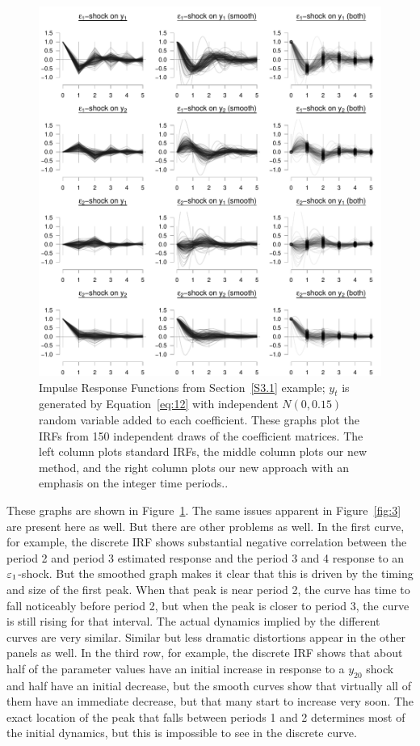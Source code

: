 \documentclass[12pt,fleqn]{article}
\begin{document}
\begin{figure}[t]
  \centering
  \includegraphics{graphs/numeric2.pdf}
  \caption{Impulse Response Functions from Section~\ref{S3.1} example;
    $y_t$ is generated by Equation~\eqref{eq:12} with independent
    $N(0,0.15)$ random variable added to each coefficient. These
    graphs plot the IRFs from 150 independent draws of the
    coefficient matrices. The left column plots standard IRFs, the
    middle column plots our new method, and the right column plots our
    new approach with an emphasis on the integer time periods..}
  \label{fig:4}
\end{figure}

These graphs are shown in Figure~\ref{fig:4}. The same issues apparent
in Figure~\ref{fig:3} are present here as well. But there are other
problems as well. In the first curve, for example, the discrete IRF
shows substantial negative correlation between the period 2 and period
3 estimated response and the period 3 and 4 response to an
$\varepsilon_1$-shock. But the smoothed graph makes it clear that this is
driven by the timing and size of the first peak. When that peak is
near period 2, the curve has time to fall noticeably before period 2,
but when the peak is closer to period 3, the curve is still rising for
that interval. The actual dynamics implied by the different curves are
very similar. Similar but less dramatic distortions appear in the
other panels as well. In the third row, for example, the discrete
IRF shows that about half of the parameter values have an initial
increase in response to a $y_{20}$ shock and half have an initial
decrease, but the smooth curves show that virtually all of them have
an immediate decrease, but that many start to increase very soon. The
exact location of the peak that falls between periods 1 and 2
determines most of the initial dynamics, but this is impossible to see
in the discrete curve.
\end{document}
